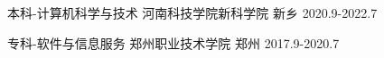 
\begin{cventries}
	
	\cventry
	{本科-计算机科学与技术} %
	{河南科技学院新科学院} %
	{新乡} %
	{2020.9-2022.7} %
	{
		\begin{cvitems} %
			{}
		\end{cvitems}
	}
	\cventry
	{专科-软件与信息服务} %
	{郑州职业技术学院} %
	{郑州} %
	{2017.9-2020.7} %
	{
		\begin{cvitems} %
			{}
		\end{cvitems}
	}
	
\end{cventries}
